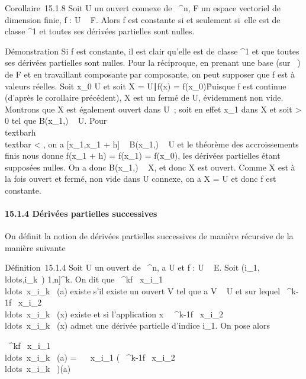 \documentclass[]{article}
\begin{document}
Corollaire~15.1.8 Soit U un ouvert connexe de ~^n, F un
espace vectoriel de dimension finie, f : U \rightarrow~ F. Alors f est constante si
et seulement si~elle est de classe ^1 et toutes ses dérivées
partielles sont nulles.

Démonstration Si f est constante, il est clair qu'elle est de classe
^1 et que toutes ses dérivées partielles sont nulles. Pour
la réciproque, en prenant une base (sur ~) de F et en travaillant
composante par composante, on peut supposer que f est à valeurs réelles.
Soit x\_0 \in U et soit X = \x \in
U∣f(x) = f(x\_0)\.
Puisque f est continue (d'après le corollaire précédent), X est un fermé
de U, évidemment non vide. Montrons que X est également ouvert dans U~;
soit en effet x\_1 dans X et soit \eta \textgreater{} 0 tel que
B(x\_1,\eta) \subset~ U. Pour
\\textbar{}h\\textbar{} \textless{} \eta, on
a {[}x\_1,x\_1 + h{]} \subset~ B(x\_1,\eta) \subset~ U et le
théorème des accroissements finis nous donne f(x\_1 + h) =
f(x\_1) = f(x\_0), les dérivées partielles étant
supposées nulles. On a donc B(x\_1,\eta) \subset~ X, et donc X est ouvert.
Comme X est à la fois ouvert et fermé, non vide dans U connexe, on a X =
U et donc f est constante.

\paragraph{15.1.4 Dérivées partielles successives}

On définit la notion de dérivées partielles successives de manière
récursive de la manière suivante

Définition~15.1.4 Soit U un ouvert de ~^n, a \in U et f : U \rightarrow~
E. Soit
(i\_1,\\ldots,i\_k~)
\in {[}1,n{]}^k. On dit que  \partial~^kf
\over
\partial~x\_i\_1\\ldots\partial~x\_i\_k~
(a) existe s'il existe un ouvert V tel que a \in V \subset~ U et sur lequel 
\partial~^k-1f \over
\partial~x\_i\_2\\ldots\partial~x\_i\_k~
(x) existe et si l'application x\mapsto~
\partial~^k-1f \over
\partial~x\_i\_2\\ldots\partial~x\_i\_k~
(x) admet une dérivée partielle d'indice i\_1. On pose alors

 \partial~^kf \over
\partial~x\_i\_1\\ldots\partial~x\_i\_k~
(a) = \partial~ \over \partial~x\_i\_1
\left ( \partial~^k-1f \over
\partial~x\_i\_2\\ldots\partial~x\_i\_k~
\right )(a)
\end{document}
